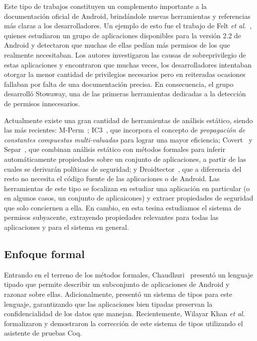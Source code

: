 Este tipo de trabajos constituyen un complemento importante a la documentación
oficial de Android, brindándole nuevas herramientas y referencias más claras a
los desarrolladores. Un ejemplo de esto fue el trabajo de Felt \textit{et
al.}~\cite{felt}, quienes estudiaron un grupo de aplicaciones disponibles para
la versión 2.2 de Android y detectaron que muchas de ellas pedían más permisos
de los que realmente necesitaban. Los autores investigaron las causas de
sobreprivilegio de estas aplicaciones y encontraron que muchas veces, los
desarrolladores intentaban otorgar la menor cantidad de privilegios necesarios
pero en reiteradas ocasiones fallaban por falta de una documentación precisa. En
consecuencia, el grupo desarrolló Stowaway, una de las primeras herramientas
dedicadas a la detección de permisos innecesarios.

Actualmente existe una gran cantidad de herramientas de análisis estático,
siendo las más recientes: M-Perm~\cite{mperm}; IC3~\cite{ic3}, que incorpora el
concepto de \textit{propagación de constantes compuestas multi-valuadas} para
lograr una mayor eficiencia; Covert~\cite{covert} y Separ~\cite{separ}, que
combinan análisis estático con métodos formales para inferir automáticamente
propiedades sobre un conjunto de aplicaciones, a partir de las cuales se
derivarán políticas de seguridad; y Droidtector~\cite{droidtector}, que a
diferencia del resto no necesita el código fuente de las aplicaciones o de
Android. Las herramientas de este tipo se focalizan en estudiar una aplicación en
particular (o en algunos casos, un conjunto de aplicaicones) y extraer
propiedades de seguridad que solo conciernen a ella. En cambio, en esta tesina
estudiamos el sistema de permisos subyacente, extrayendo propiedades relevantes
para todas las aplicaciones y para el sistema en general.


\subsection*{Enfoque formal}

Entrando en el terreno de los métodos formales, Chaudhuri~\cite{chaudhuri}
presentó un lenguaje tipado que permite describir un subconjunto de aplicaciones
de Android y razonar sobre ellas. Adicionalmente, presentó un sistema de tipos
para este lenguaje, garantizando que las aplicaciones bien tipadas preservan la
confidencialidad de los datos que manejan. Recientemente, Wilayar Khan
\textit{et al.}~\cite{khan} formalizaron y demostraron la corrección de este
sistema de tipos utilizando el asistente de pruebas Coq.

